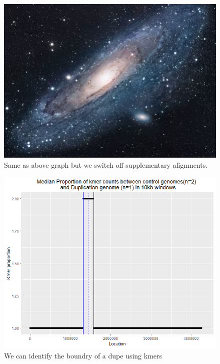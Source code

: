 \documentclass{article}
\begin{document}
 \begin{figure}[h!]
\centering
\includegraphics[scale=0.6]{universe.jpg}
\caption{Same as above graph but we switch off supplementary alignments.}
\label{fig:Kmer_abund_supp_off}
\end{figure}

\begin{figure}[h!]
\centering
\includegraphics[scale=0.6]{Kmer_dupe.png}
\caption{We can identify the boundry of a dupe using kmers}
\label{fig:kmer_dupe1}
\end{figure}
\end{document}
